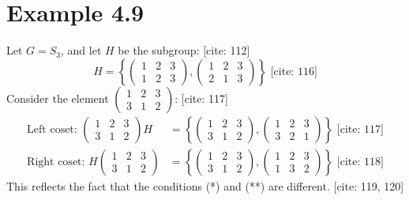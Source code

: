 \section{Example 4.9}

Let $G = S_3$, and let $H$ be the subgroup: [cite: 112]
\[ H = \left\{ \begin{pmatrix} 1 & 2 & 3 \\ 1 & 2 & 3 \end{pmatrix}, \begin{pmatrix} 1 & 2 & 3 \\ 2 & 1 & 3 \end{pmatrix} \right\} \text{ [cite: 116]} \]
Consider the element $\begin{pmatrix} 1 & 2 & 3 \\ 3 & 1 & 2 \end{pmatrix}$: [cite: 117]
\begin{align*}
    \text{Left coset: } \begin{pmatrix} 1 & 2 & 3 \\ 3 & 1 & 2 \end{pmatrix} H &= \left\{ \begin{pmatrix} 1 & 2 & 3 \\ 3 & 1 & 2 \end{pmatrix}, \begin{pmatrix} 1 & 2 & 3 \\ 3 & 2 & 1 \end{pmatrix} \right\} \text{ [cite: 117]} \\
    \text{Right coset: } H \begin{pmatrix} 1 & 2 & 3 \\ 3 & 1 & 2 \end{pmatrix} &= \left\{ \begin{pmatrix} 1 & 2 & 3 \\ 3 & 1 & 2 \end{pmatrix}, \begin{pmatrix} 1 & 2 & 3 \\ 1 & 3 & 2 \end{pmatrix} \right\} \text{ [cite: 118]}
\end{align*}
This reflects the fact that the conditions (*) and (**) are different. [cite: 119, 120]
